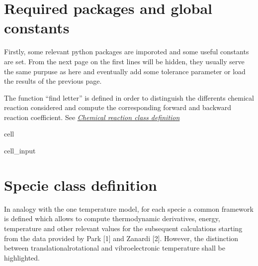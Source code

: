 \documentclass[letterpaper,10pt,english]{jupyterBook}
\begin{document}
\chapter{Required packages and global constants}
\label{\detokenize{2_Temperature/_2T_code_structure:required-packages-and-global-constants}}
\sphinxAtStartPar
Firstly, some relevant python packages are imporoted and some useful constants are set. From the next page on the first lines will be hidden, they usually serve the same purpuse as here and eventually add some tolerance parameter or load the results of the previous page.

\sphinxAtStartPar
The function “find letter” is defined in order to distinguish the differents chemical reaction considered and compute the corresponding forward and backward reaction coefficient. See {\hyperref[\detokenize{2_Temperature/_2T_code_structure:Chemical-reaction-class-definition}]{\emph{Chemical reaction class definition}}}

\begin{sphinxuseclass}{cell}\begin{sphinxVerbatimInput}

\begin{sphinxuseclass}{cell_input}
\begin{sphinxVerbatim}[commandchars=\\\{\}]
  
           
\end{sphinxVerbatim}

\end{sphinxuseclass}\end{sphinxVerbatimInput}

\end{sphinxuseclass}

\chapter{Specie class definition}
\label{\detokenize{2_Temperature/_2T_Specie_class_definition:specie-class-definition}}\label{\detokenize{2_Temperature/_2T_Specie_class_definition::doc}}
\sphinxAtStartPar
In analogy with the one temperature model, for each specie a common framework is defined which allows to compute thermodynamic derivatives, energy, temperature and other relevant values for the subsequent calculations starting from the data provided by Park {[}1{]} and Zanardi {[}2{]}. However, the distinction between translational\sphinxhyphen{}rotational and vibro\sphinxhyphen{}electronic temperature shall be highlighted.
\end{document}

